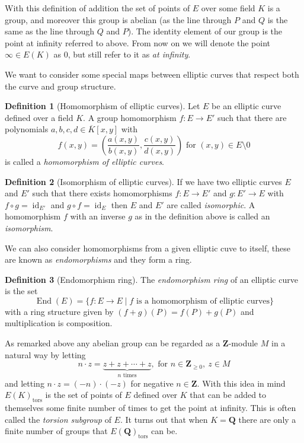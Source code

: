 \documentclass[12pt,a4paper,abstracton,bibtotoc]{scrreprt}
\theoremstyle{definition}
\newtheorem{defn}{Definition}
\newcommand{\QQ}{\mathbf{Q}}
\newcommand{\ZZ}{\mathbf{Z}}
\DeclareMathOperator{\End}{End}
\DeclareMathOperator{\id}{id}
\begin{document}
With this definition of addition the set of points of $E$ over some field $K$ is a group, and moreover this group is abelian (as the line through $P$ and $Q$ is the same as the line through $Q$ and $P$).
The identity element of our group is the point at infinity referred to above.
From now on we will denote the point $\infty\in E(K)$ as $0$, but still refer to it as \emph{at infinity}.

We want to consider some special maps between elliptic curves that respect both the curve and group structure.
\begin{defn}[Homomorphism of elliptic curves]
Let $E$ be an elliptic curve defined over a field $K$.
A group homomorphism $f\colon E \to E'$ such that there are polynomials $a,b,c,d\in \overline{K}[x,y]$ with
\[
f(x,y) = \left(\frac{a(x,y)}{b(x,y)},\frac{c(x,y)}{d(x,y)}\right) \text{ for } (x,y) \in E\setminus 0
\]
is called a \emph{homomorphism of elliptic curves}.
\end{defn}

\begin{defn}[Isomorphism of elliptic curves]
If we have two elliptic curves $E$ and $E'$ such that there exists homomorphisms $f\colon E \to E'$ and $g\colon E'\to E$ with $f\circ g = \id_{E'}$ and $g\circ f = \id_{E}$ then $E$ and $E'$ are called \emph{isomorphic}.
A homomorphism $f$ with an inverse $g$ as in the definition above is called an \emph{isomorphism}.
\end{defn}

We can also consider homomorphisms from a given elliptic cuve to itself, these are known as \emph{endomorphisms} and they form a ring.

\begin{defn}[Endomorphism ring]
The \emph{endomorphism ring} of an elliptic curve is the set
\[
\End(E) = \{f\colon E \to E\mid f \text{ is a homomorphism of elliptic curves}\}
\]
with a ring structure given by $(f+g)(P) = f(P) + g(P)$ and multiplication is composition.
\end{defn}

As remarked above any abelian group can be regarded as a $\ZZ$-module $M$ in a natural way by letting 
\[n\cdot z = \underbrace{z + z + \cdots + z}_\text{$n$ times},\text{ for } n\in\ZZ_{\ge 0},\ z\in M\]
and letting $n\cdot z = (-n)\cdot(-z)$ for negative $n\in \ZZ$.
With this idea in mind $E(K)_\text{tors}$ is the set of points of $E$ defined over $K$ that can be added to themselves some finite number of times to get the point at infinity.
This is often called the \emph{torsion subgroup} of $E$.
It turns out that when $K = \QQ$ there are only a finite number of groups that $E(\QQ)_\text{tors}$ can be.
\end{document}

